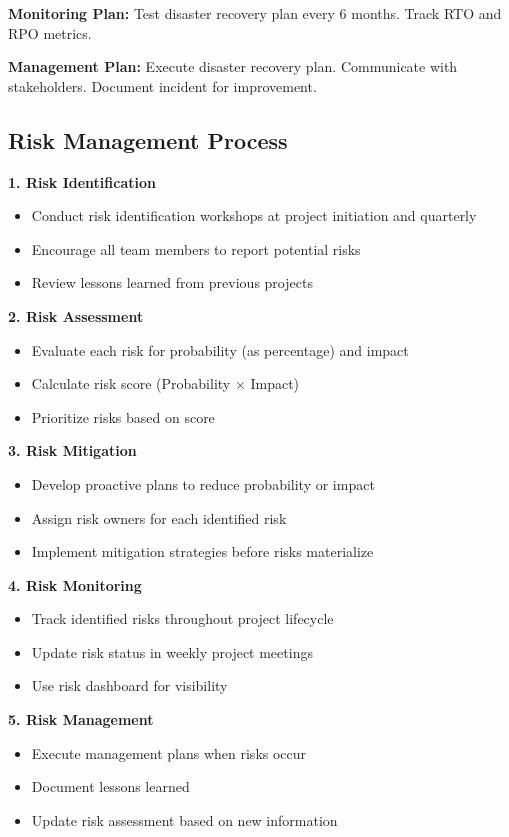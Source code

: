 \textbf{Monitoring Plan:} Test disaster recovery plan every 6 months. Track RTO and RPO metrics.

\textbf{Management Plan:} Execute disaster recovery plan. Communicate with stakeholders. Document incident for improvement.

\subsection{Risk Management Process}

\textbf{1. Risk Identification}
\begin{itemize}[leftmargin=*]
    \item Conduct risk identification workshops at project initiation and quarterly
    \item Encourage all team members to report potential risks
    \item Review lessons learned from previous projects
\end{itemize}

\textbf{2. Risk Assessment}
\begin{itemize}[leftmargin=*]
    \item Evaluate each risk for probability (as percentage) and impact
    \item Calculate risk score (Probability × Impact)
    \item Prioritize risks based on score
\end{itemize}

\textbf{3. Risk Mitigation}
\begin{itemize}[leftmargin=*]
    \item Develop proactive plans to reduce probability or impact
    \item Assign risk owners for each identified risk
    \item Implement mitigation strategies before risks materialize
\end{itemize}

\textbf{4. Risk Monitoring}
\begin{itemize}[leftmargin=*]
    \item Track identified risks throughout project lifecycle
    \item Update risk status in weekly project meetings
    \item Use risk dashboard for visibility
\end{itemize}

\textbf{5. Risk Management}
\begin{itemize}[leftmargin=*]
    \item Execute management plans when risks occur
    \item Document lessons learned
    \item Update risk assessment based on new information
\end{itemize}


